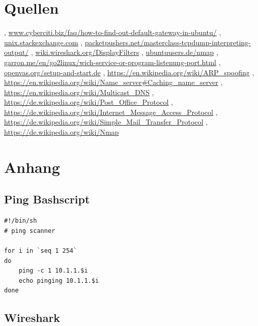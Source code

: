 \documentclass[12pt]{article}
\theoremstyle{plain}
\begin{document}
\section{Quellen}
\begin{thebibliography}{50}
\bibitem  [Cyberciti], \url{www.cyberciti.biz/faq/how-to-find-out-default-gateway-in-ubuntu/}
\bibitem [Stackexchange] , \url{unix.stackexchange.com}
\bibitem [Tcpdump], \url{packetpushers.net/masterclass-tcpdump-interpreting-output/}
\bibitem [Wireshark], \url{wiki.wireshark.org/DisplayFilters}
\bibitem [Nmap 1], \url{ubuntuusers.de/nmap}
\bibitem [Nmap 2], \url{garron.me/en/go2linux/wich-service-or-program-listenung-port.html}
\bibitem [OpenVAS], \url{openvas.org/setup-and-start.de}
, \url{https://en.wikipedia.org/wiki/ARP_spoofing}
\bibitem [DNS], \url{https://en.wikipedia.org/wiki/Name_server#Caching_name_server}
\bibitem [DNS 2], \url{https://en.wikipedia.org/wiki/Multicast_DNS}
\bibitem [POP], \url{https://de.wikipedia.org/wiki/Post_Office_Protocol}
\bibitem [IMAP], \url{https://de.wikipedia.org/wiki/Internet_Message_Access_Protocol}
\bibitem [SMTP], \url{https://de.wikipedia.org/wiki/Simple_Mail_Transfer_Protocol}
\bibitem [Nmap 3], \url{https://de.wikipedia.org/wiki/Nmap}	
\end{thebibliography}
\newpage
\section{Anhang}
\subsection*{Ping Bashscript}
\begin{lstlisting}
#!/bin/sh
# ping scanner

for i in `seq 1 254`
do
	ping -c 1 10.1.1.$i
	echo pinging 10.1.1.$i
done

\end{lstlisting}
\subsection*{Wireshark}
\end{document}
